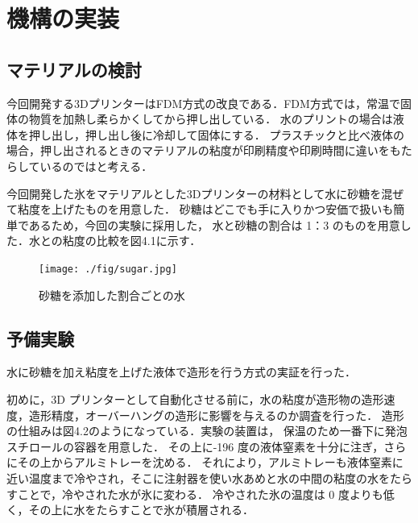 \chapter{機構の実装}
\label{chp:first}

\section{マテリアルの検討}
\label{sec:paragraph}
今回開発する3DプリンターはFDM方式の改良である．FDM方式では，常温で固体の物質を加熱し柔らかくしてから押し出している．
水のプリントの場合は液体を押し出し，押し出し後に冷却して固体にする．
プラスチックと比べ液体の場合，押し出されるときのマテリアルの粘度が印刷精度や印刷時間に違いをもたらしているのではと考える．

今回開発した氷をマテリアルとした3Dプリンターの材料として水に砂糖を混ぜて粘度を上げたものを用意した．
砂糖はどこでも手に入りかつ安価で扱いも簡単であるため，今回の実験に採用した，
水と砂糖の割合は 1：3 のものを用意した．水との粘度の比較を図4.1に示す．

\begin{figure}[H]
  \centering
  \texttt{[image: ./fig/sugar.jpg]}
  \caption{砂糖を添加した割合ごとの水}
  \label{fig:stage}
\end{figure}


\section{予備実験}
\label{sec:paragraph}

水に砂糖を加え粘度を上げた液体で造形を行う方式の実証を行った．

初めに，3D プリンターとして自動化させる前に，水の粘度が造形物の造形速度，造形精度，オーバーハングの造形に影響を与えるのか調査を行った． 
造形の仕組みは図4.2のようになっている．実験の装置は， 保温のため一番下に発泡スチロールの容器を用意した．
その上に-196 度の液体窒素を十分に注ぎ，さらにその上からアルミトレーを沈める．
それにより，アルミトレーも液体窒素に近い温度まで冷やされ，そこに注射器を使い水あめと水の中間の粘度の水をたらすことで，冷やされた水が氷に変わる．
冷やされた氷の温度は 0 度よりも低く，その上に水をたらすことで氷が積層される． 

